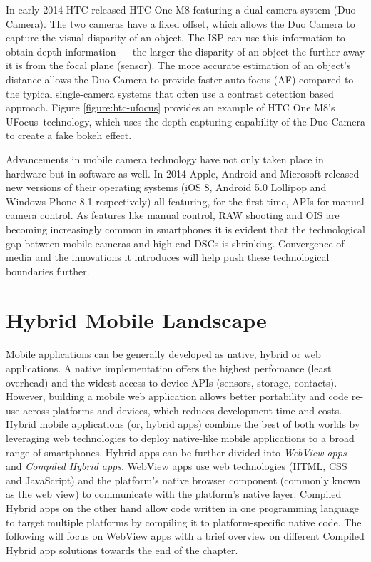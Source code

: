 \documentclass[thesis.tex]{subfiles}
\begin{document}
In early 2014 HTC released HTC One M8 featuring a dual camera system (Duo Camera). The two cameras have a fixed offset, which allows the Duo Camera to capture the visual disparity of an object. The ISP can use this information to obtain depth information --- the larger the disparity of an object the further away it is from the focal plane (sensor). The more accurate estimation of an object's distance allows the Duo Camera to provide faster auto-focus (AF) compared to the typical single-camera systems that often use a contrast detection based approach. Figure \ref{figure:htc-ufocus} provides an example of HTC One M8's UFocus\texttrademark\ technology, which uses the depth capturing capability of the Duo Camera to create a fake bokeh effect.

Advancements in mobile camera technology have not only taken place in hardware but in software as well. In 2014 Apple, Android and Microsoft released new versions of their operating systems (iOS 8, Android 5.0 Lollipop and Windows Phone 8.1 respectively) all featuring, for the first time, APIs for manual camera control. As features like manual control, RAW shooting and OIS are becoming increasingly common in smartphones it is evident that the technological gap between mobile cameras and high-end DSCs is shrinking. Convergence of media and the innovations it introduces will help push these technological boundaries further.

\section{Hybrid Mobile Landscape}

Mobile applications can be generally developed as native, hybrid or web applications. A native implementation offers the highest perfomance (least overhead) and the widest access to device APIs (sensors, storage, contacts). However, building a mobile web application allows better portability and code re-use across platforms and devices, which reduces development time and costs. Hybrid mobile applications (or, hybrid apps) combine the best of both worlds by leveraging web technologies to deploy native-like mobile applications to a broad range of smartphones. Hybrid apps can be further divided into \textit{WebView apps} and \textit{Compiled Hybrid apps}. WebView apps use web technologies (HTML, CSS and JavaScript) and the platform's native browser component (commonly known as the web view) to communicate with the platform's native layer. Compiled Hybrid apps on the other hand allow code written in one programming language to target multiple platforms by compiling it to platform-specific native code. The following will focus on WebView apps with a brief overview on different Compiled Hybrid app solutions towards the end of the chapter.
\end{document}
